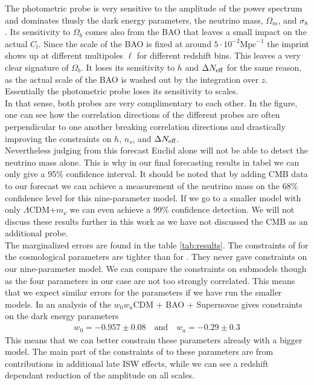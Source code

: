 \documentclass[../main.tex]{subfiles}
\begin{document}
    The photometric probe is very sensitive to the amplitude of the power spectrum and dominates thusly the dark energy parameters, the neutrino mass, $\Omega_m$, and $\sigma_8$. Its sensitivity to $\Omega_b$ comes also from the BAO that leaves a small impact on the actual $C_l$. Since the scale of the BAO is fixed at around $5\cdot10^{-2} \mathrm{Mpc}^{-1}$ the imprint shows up at different multipoles $\ell$ for different redshift bins. This leaves a very clear signature of $\Omega_b$. It loses its sensitivity to $h$ and $\Delta N_\mathrm{eff}$ for the same reason, as the actual scale of the BAO is washed out by the integration over $z$. Essentially the photometric probe loses its sensitivity to scales.\\
    In that sense, both probes are very complimentary to each other. In the figure, one can see how the correlation directions of the different probes are often perpendicular to one another breaking correlation directions and drastically improving the constraints on $h$, $n_s$, and $\Delta N_\mathrm{eff}$.\\
    Nevertheless judging from this forecast Euclid alone will not be able to detect the neutrino mass alone. This is why in our final forecasting results in tabel we can only give a 95\% confidence interval. It should be noted that by adding CMB data to our forecast we can achieve a measurement of the neutrino mass on the 68\% confidence level for this nine-parameter model. If we go to a smaller model with only $\Lambda$CDM+$m_\nu$ we can even achieve a 99\% confidence detection. We will not discuss these results further in this work as we have not discussed the CMB as an additional probe.\\
    The marginalized errors are found in the table \ref{tab:results}. The constraints of \Euclid for the cosmological parameters are tighter than for \Planck. They never gave constraints on our nine-parameter model. We can compare the constraints on submodels though as the four parameters in our case are not too strongly correlated. This means that we expect similar errors for the parameters if we have run the smaller models. In an analysis of the $w_0w_a$CDM \Planck + BAO + Supernovae gives constraints on the dark energy parameters \begin{align*}
        w_0 = -0.957 \pm 0.08 \quad \text{and}\quad w_a = -0.29 \pm 0.3
    \end{align*}
    This means that we can better constrain these parameters already with a bigger model. The main part of the constraints of \Planck to these parameters are from contributions in additional late ISW effects, while \Euclid we can see a redshift dependant reduction of the amplitude on all scales.\\
\end{document}
